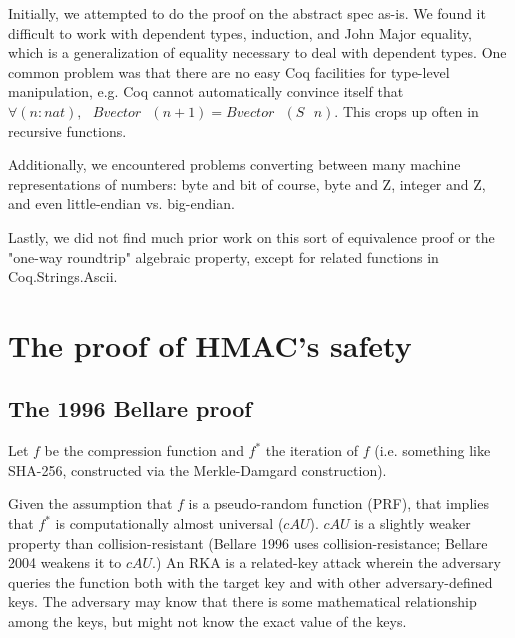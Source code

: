 \documentclass[twocolumn,showpacs,%
  nofootinbib,aps,superscriptaddress,%
  eqsecnum,prd,notitlepage,showkeys,10pt]{revtex4-1}
\newcommand{\s} {\textrm{ }}
\begin{document}
Initially, we attempted to do the proof on the abstract spec as-is. We found it difficult to work with dependent types, induction, and John Major equality, which is a generalization of equality necessary to deal with dependent types. One common problem was that there are no easy Coq facilities for type-level manipulation, e.g. Coq cannot automatically convince itself that $\forall (n : nat), \s Bvector \s (n+1) = Bvector \s (S \s n)$. This crops up often in recursive functions.

Additionally, we encountered problems converting between many machine representations of numbers: byte and bit of course, byte and Z, integer and Z, and even little-endian vs. big-endian.

Lastly, we did not find much prior work on this sort of equivalence proof or the "one-way roundtrip" algebraic property, except for related functions in Coq.Strings.Ascii.

\section{The proof of HMAC's safety}

\subsection{The 1996 Bellare proof}

Let $f$ be the compression function and $f^*$ the iteration of $f$ (i.e. something like SHA-256, constructed via the Merkle-Damgard construction).

Given the assumption that $f$ is a pseudo-random function (PRF), that implies that $f^*$ is computationally almost universal ($cAU$). $cAU$ is a slightly weaker property than collision-resistant (Bellare 1996 uses collision-resistance; Bellare 2004 weakens it to $cAU$.) An RKA is a related-key attack wherein the adversary queries the function both with the target key and with other adversary-defined keys. The adversary may know that there is some mathematical relationship among the keys, but might not know the exact value of the keys.
\end{document}
